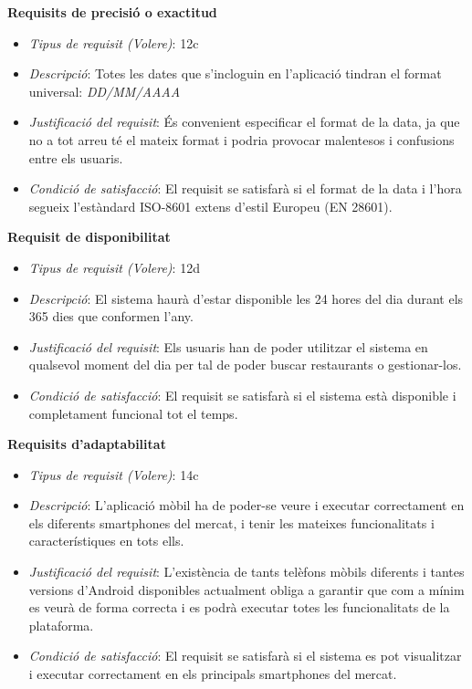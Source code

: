 \noindent\textbf{Requisits de precisió o exactitud}
\begin{itemize}
\item \textit{Tipus de requisit (Volere)}: 12c
\item \textit{Descripció}: Totes les dates que s'incloguin en l'aplicació tindran el format universal: \textit{DD/MM/AAAA}
\item \textit{Justificació del requisit}: És convenient especificar el format de la data, ja que no a tot arreu té el mateix format i podria provocar malentesos i confusions entre els usuaris.
\item \textit{Condició de satisfacció}: El requisit se satisfarà si el format de la data i l'hora segueix l'estàndard ISO-8601\cite{iso8601} extens d'estil Europeu (EN 28601).
\end{itemize}

\noindent\textbf{Requisit de disponibilitat}
\begin{itemize}
\item \textit{Tipus de requisit (Volere)}: 12d
\item \textit{Descripció}: El sistema haurà d'estar disponible les 24 hores del dia durant els 365 dies que conformen l'any.
\item \textit{Justificació del requisit}: Els usuaris han de poder utilitzar el sistema en qualsevol moment del dia per tal de poder buscar restaurants o gestionar-los.
\item \textit{Condició de satisfacció}: El requisit se satisfarà si el sistema està disponible i completament funcional tot el temps.
\end{itemize}

\noindent\textbf{Requisits d'adaptabilitat}
\begin{itemize}
\item \textit{Tipus de requisit (Volere)}: 14c
\item \textit{Descripció}: L'aplicació mòbil ha de poder-se veure i executar correctament en els diferents smartphones del mercat, i tenir les mateixes funcionalitats i característiques en tots ells.
\item \textit{Justificació del requisit}: L'existència de tants telèfons mòbils diferents i tantes versions d'Android disponibles actualment obliga a garantir que com a mínim es veurà de forma correcta i es podrà executar totes les funcionalitats de la plataforma.
\item \textit{Condició de satisfacció}: El requisit se satisfarà si el sistema es pot visualitzar i executar correctament en els principals smartphones del mercat.
\end{itemize}

